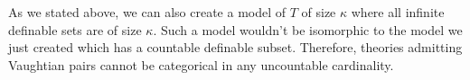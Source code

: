 

As we stated above, we can also create a model of \(T\) of size \(\kappa\) where all infinite definable sets are of size \(\kappa\). 
Such a model wouldn't be isomorphic to the model we just created which has a countable definable subset. 
Therefore, theories admitting Vaughtian pairs cannot be categorical in any uncountable cardinality.
